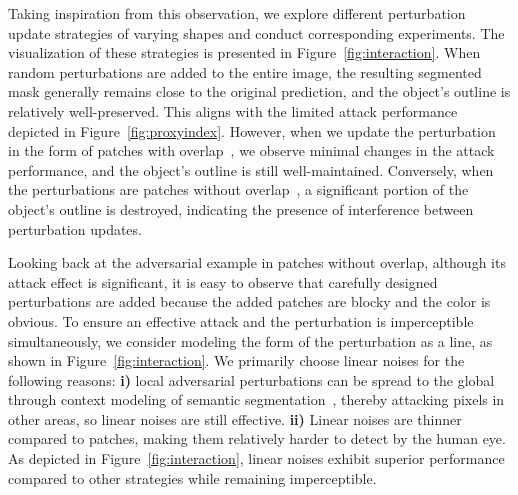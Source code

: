 \documentclass[10pt,twocolumn,letterpaper]{article}
\begin{document}
Taking inspiration from this observation, we explore different perturbation update strategies of varying shapes and conduct corresponding experiments. The visualization of these strategies is presented in Figure~\ref{fig:interaction}. When random perturbations are added to the entire image, the resulting segmented mask generally remains close to the original prediction, and the object's outline is relatively well-preserved. This aligns with the limited attack performance depicted in Figure~\ref{fig:proxyindex}. However, when we update the perturbation in the form of patches with overlap~\cite{square}, we observe minimal changes in the attack performance, and the object's outline is still well-maintained. Conversely, when the perturbations are patches without overlap~\cite{bandits}, a significant portion of the object's outline is destroyed, indicating the presence of interference between perturbation updates.

Looking back at the adversarial example in patches without overlap, although its attack effect is significant, it is easy to observe that carefully designed perturbations are added because the added patches are blocky and the color is obvious.
To ensure an effective attack and the perturbation is imperceptible simultaneously, we consider modeling the form of the perturbation as a line, as shown in Figure~\ref{fig:interaction}. We primarily choose linear noises for the following reasons: \textbf{i)} local adversarial perturbations can be spread to the global through context modeling of semantic segmentation~\cite{indirect}, thereby attacking pixels in other areas, so linear noises are still effective. \textbf{ii)} Linear noises are thinner compared to patches, making them relatively harder to detect by the human eye. As depicted in Figure~\ref{fig:interaction}, linear noises exhibit superior performance compared to other strategies while remaining imperceptible.

\begin{table}[t]
\caption{Search strategy for perturbation values. We report the mIoU under 50/200 query budgets and observe that for the same queries, discrete perturbations always obtain lower mIoU (\%).}
\label{tab:pervalue}
\setlength{\tabcolsep}{2mm}
\vspace{-8pt}
\end{table}
\end{document}
